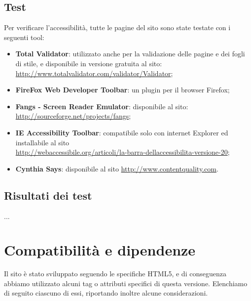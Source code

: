 \documentclass[12pt]{article}
\begin{document}
	\subsection{Test}
	Per verificare l'accessibilità, tutte le pagine del sito sono state testate con i seguenti tool:
	\begin{itemize}
		\item \textbf{Total Validator}: utilizzato anche per la validazione delle pagine e dei fogli di stile, e disponibile in versione gratuita al sito: 
		\url{http://www.totalvalidator.com/validator/Validator};
		\item \textbf{FireFox Web Developer Toolbar}: un plugin per il browser Firefox;
		\item \textbf{Fangs - Screen Reader Emulator}: disponibile al sito: \url{http://sourceforge.net/projects/fangs};
		\item \textbf{IE Accessibility Toolbar}: compatibile solo con internet Explorer ed installabile al sito\\ \url{http://webaccessibile.org/articoli/la-barra-dellaccessibilita-versione-20};
		\item \textbf{Cynthia Says}: disponibile al sito \url{http://www.contentquality.com}.
	\end{itemize}

	\subsection{Risultati dei test}
	...
	
	\section{Compatibilità e dipendenze}
	Il sito è stato sviluppato seguendo le specifiche HTML5, e di conseguenza abbiamo utilizzato alcuni tag o attributi specifici di questa versione. Elenchiamo di seguito ciascuno di essi, riportando inoltre alcune considerazioni.
\end{document}
